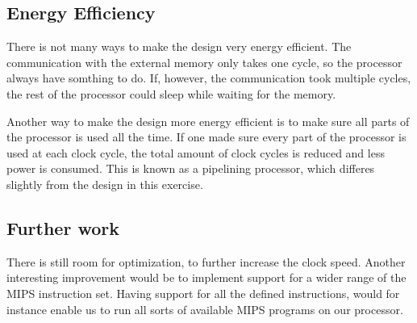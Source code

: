 \subsection{Energy Efficiency}
There is not many ways to make the design very energy efficient.
The communication with the external memory only takes one cycle, so the processor always have somthing to do.
If, however, the communication took multiple cycles, the rest of the processor could sleep while waiting for the memory.

Another way to make the design more energy efficient is to make sure all parts of the processor is used all the time.
If one made sure every part of the processor is used at each clock cycle,
the total amount of clock cycles is reduced and less power is consumed.
This is known as a pipelining processor, which differes slightly from the design in this exercise.

\subsection{Further work}

There is still room for optimization, to further increase the clock speed.
Another interesting improvement would be to implement support for a wider range of the MIPS instruction set.
Having support for all the defined instructions, would for instance enable us to run all sorts of available MIPS programs on our processor.
